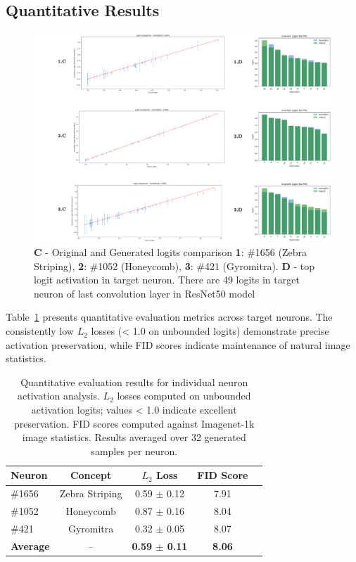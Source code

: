 \documentclass[licencjacka,en]{pracamgr}
\begin{document}
\subsection{Quantitative Results}

\begin{figure}[h]
\centering
\includegraphics[width=\linewidth]{figures/main/sae_results_2.png}
\caption{ \textbf{C} - Original and Generated logits comparison  \textbf{1}: \#1656 (Zebra Striping), \textbf{2}: \#1052 (Honeycomb), \textbf{3}: \#421 (Gyromitra). \textbf{D} - top logit activation in target neuron. There are 49 logits in target neuron of last convolution layer in ResNet50 model}
\label{fig:experiment_1_1}
\end{figure}

Table~\ref{tab:neuron_results} presents quantitative evaluation metrics across target neurons. The consistently low $L_2$ losses (< 1.0 on unbounded logits) demonstrate precise activation preservation, while FID scores indicate maintenance of natural image statistics.

\begin{table}[h!]
\centering
\begin{tabular}{lcccc}
\toprule
\textbf{Neuron} & \textbf{Concept} & \textbf{$L_2$ Loss} & \textbf{FID Score}\\
\midrule
\#1656 & Zebra Striping & 0.59 $\pm$ 0.12 & 7.91 \\
\#1052 & Honeycomb & 0.87 $\pm$ 0.16 & 8.04\\
\#421 & Gyromitra & 0.32 $\pm$ 0.05 & 8.07\\
\midrule
\textbf{Average} & -- & \textbf{0.59 $\pm$ 0.11} & \textbf{8.06}  \\
\bottomrule
\end{tabular}
\caption{Quantitative evaluation results for individual neuron activation analysis. $L_2$ losses computed on unbounded activation logits; values < 1.0 indicate excellent preservation. FID scores computed against Imagenet-1k  image statistics. Results averaged over 32 generated samples per neuron.}
\label{tab:neuron_results}
\end{table}
\end{document}
